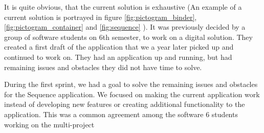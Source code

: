 It is quite obvious, that the current solution is exhaustive (An example of a current solution is portrayed in figure \ref{fig:pictogram_binder},\ref{fig:pictogram_container} and \ref{fig:sequence} ). It was previously decided by a group of software students on 6th semester, to work on a digital solution. They created a first draft of the application that we a year later picked up and continued to work on. They had an application up and running, but had remaining issues and obstacles they did not have time to solve.

During the first sprint, we had a goal to solve the remaining issues and obstacles for the Sequence application. We focused on making the current application work instead of developing new features or creating additional functionality to the application. This was a common agreement among the software 6 students working on the multi-project




